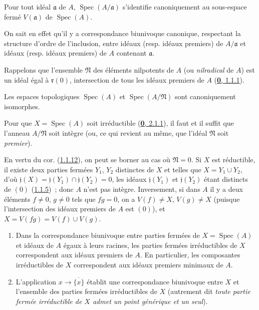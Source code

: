 \begin{proposition}[1.1.11]
\label{I.1.1.11-fr}
Pour tout idéal $\mathfrak{a}$ de $A$,
$\operatorname{Spec}(A/\mathfrak{a})$ s'identifie canoniquement au sous-espace
fermé $V(\mathfrak{a})$ de $\operatorname{Spec}(A)$.
\end{proposition}

On sait en effet qu'il y a correspondance biunivoque canonique, respectant la
structure d'ordre de l'inclusion, entre idéaux (resp. idéaux premiers) de
$A/\mathfrak{a}$ et idéaux (resp. idéaux premiers) de $A$ contenant
$\mathfrak{a}$.

Rappelons que l'ensemble $\mathfrak{N}$ des éléments nilpotents de $A$ (ou
\emph{nilradical} de $A$) est un idéal égal à $\mathfrak{r}(0)$, intersection
de tous les idéaux premiers de $A$
(\hyperref[0.1.1.1-fr]{\textbf{0}, 1.1.1}).

\begin{corollary}[1.1.12]
\label{I.1.1.12-fr}
Les espaces topologiques $\operatorname{Spec}(A)$ et
$\operatorname{Spec}(A/\mathfrak{N})$ sont canoniquement isomorphes.
\end{corollary}

\begin{proposition}[1.1.13]
\label{I.1.1.13-fr}
Pour que $X=\operatorname{Spec}(A)$ soit irréductible
\textup{(\hyperref[0.2.1.1-fr]{\textbf{0}, 2.1.1})}, il faut et il suffit que l'anneau
$A/\mathfrak{N}$ soit intègre \textup{(ou, ce qui revient au même, que l'idéal
$\mathfrak{N}$ soit \emph{premier})}.
\end{proposition}

En vertu du cor. (\hyperref[I.1.1.12-fr]{1.1.12}), on peut se borner au cas où
$\mathfrak{N}=0$. Si $X$ est réductible, il existe deux parties fermées
$Y_1$, $Y_2$ distinctes de $X$ et telles que $X=Y_1\cup Y_2$, d'où
$\mathfrak{j}(X)=\mathfrak{j}(Y_1)\cap\mathfrak{j}(Y_2)=0$, les idéaux
$\mathfrak{j}(Y_1)$ et $\mathfrak{j}(Y_2)$ étant distincts de $(0)$
(\hyperref[I.1.1.5-fr]{1.1.5})~; donc $A$ n'est pas intègre. Inversement, si
dans $A$ il y a deux éléments $f\neq0$, $g\neq0$ tels que $fg=0$, on a
$V(f)\neq X$, $V(g)\neq X$ (puisque l'intersection des idéaux premiers de
$A$ est $(0)$), et $X=V(fg)=V(f)\cup V(g)$.

\begin{corollary}[1.1.14]
\label{I.1.1.14-fr}
\begin{enumerate}
  \item[\rm(i)] Dans la correspondance biunivoque entre parties fermées de
  $X=\operatorname{Spec}(A)$ et idéaux de $A$ égaux à leurs racines, les
  parties fermées irréductibles de $X$ correspondent aux idéaux premiers de
  $A$. En particulier, les composantes irréductibles de $X$ correspondent aux
  idéaux premiers minimaux de $A$.
  \item[\rm(ii)] L'application $x\to\overline{\{x\}}$ établit une
  correspondance biunivoque entre $X$ et l'ensemble des parties fermées
  irréductibles de $X$ \textup{(autrement dit \emph{toute partie fermée irréductible de $X$
  admet un point générique et un seul})}.
\end{enumerate}
\end{corollary}

